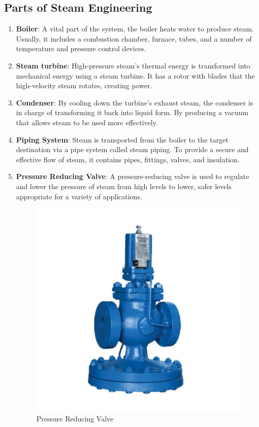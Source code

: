 \subsection{Parts of Steam Engineering}
\begin{enumerate}
    \item \textbf{Boiler}: A vital part of the system, the boiler heats water to produce steam. Usually, it includes a combustion chamber, furnace, tubes, and a number of temperature and pressure control devices. 
    \item \textbf{Steam turbine}: High-pressure steam's thermal energy is transformed into mechanical energy using a steam turbine. It has a rotor with blades that the high-velocity steam rotates, creating power. 
    \item \textbf{Condenser}: By cooling down the turbine's exhaust steam, the condenser is in charge of transforming it back into liquid form. By producing a vacuum that allows steam to be used more effectively. 
    \item \textbf{Piping System}: Steam is transported from the boiler to the target destination via a pipe system called steam piping. To provide a secure and effective flow of steam, it contains pipes, fittings, valves, and insulation. 
    \item \textbf{Pressure Reducing Valve}: A pressure-reducing valve is used to regulate and lower the pressure of steam from high levels to lower, safer levels appropriate for a variety of applications. 
   
    \begin{figure}[h!]
        \centering
        \includegraphics[width=\linewidth]{figs/lastmin/pressure_reducing valve.png}
        \caption{Pressure Reducing Valve}
        \label{fig:prv}
    \end{figure}
    

\end{enumerate}
